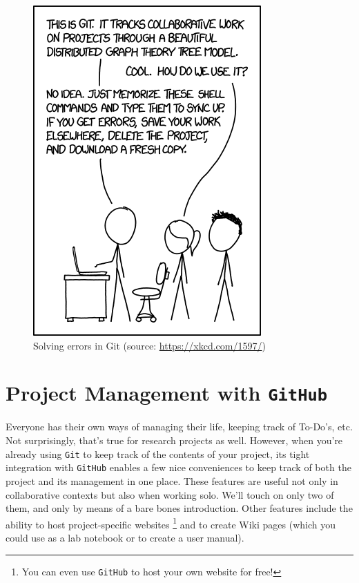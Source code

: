 \documentclass[12pt,letterpaper]{article}
\begin{document}
\begin{figure}[h]
	\centering
	\includegraphics[width=0.5\linewidth]{figs/gitreset.png}
	\caption{Solving errors in Git (source: \url{https://xkcd.com/1597/})}
	\label{fig:gitreset}
\end{figure}



\section{Project Management with \texttt{GitHub}}
Everyone has their own ways of managing their life, keeping track of To-Do's, etc.
Not surprisingly, that's true for research projects as well.
However, when you're already using \texttt{Git} to keep track of the contents of 
your project, its tight integration with \texttt{GitHub} enables a few nice 
conveniences to keep track of both the project and its management in one 
place.
These features are useful not only in collaborative contexts but also when working solo.
We'll touch on only two of them, and only by means of a bare bones 
introduction.
Other features include the ability to host project-specific websites
\unskip
\footnote{You can even use \texttt{GitHub} to host your own website for free!}
 and to  create Wiki pages (which you could use as a lab notebook or to create 
 a user manual).
\end{document}
